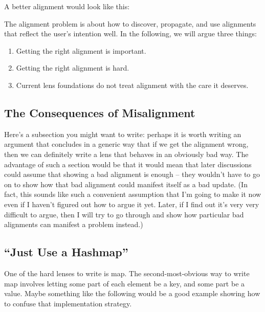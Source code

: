 \noindent A better alignment would look like this:

\begin{center}
\end{center}

\noindent The alignment problem is about how to discover, propagate, and use
alignments that reflect the user's intention well. In the following, we will
argue three things:
\begin{enumerate}
    \item Getting the right alignment is important.
    \item Getting the right alignment is hard.
    \item Current lens foundations do not treat alignment with the care it
        deserves.
\end{enumerate}

\subsection{The Consequences of Misalignment}
Here's a subsection you might want to write: perhaps it is worth writing an
argument that concludes in a generic way that if we get the alignment wrong,
then we can definitely write a lens that behaves in an obviously bad way.
The advantage of such a section would be that it would mean that later
discussions could assume that showing a bad alignment is enough -- they
wouldn't have to go on to show how that bad alignment could manifest itself
as a bad update. (In fact, this sounds like such a convenient assumption
that I'm going to make it now even if I haven't figured out how to argue it
yet. Later, if I find out it's very very difficult to argue, then I will try
to go through and show how particular bad alignments can manifest a problem
instead.)

\subsection{``Just Use a Hashmap''}
One of the hard lenses to write is map.
The second-most-obvious way to write map involves letting some part of each
element be a key, and some part be a value.
Maybe something like the following would be a good example showing how to
confuse that implementation strategy.

